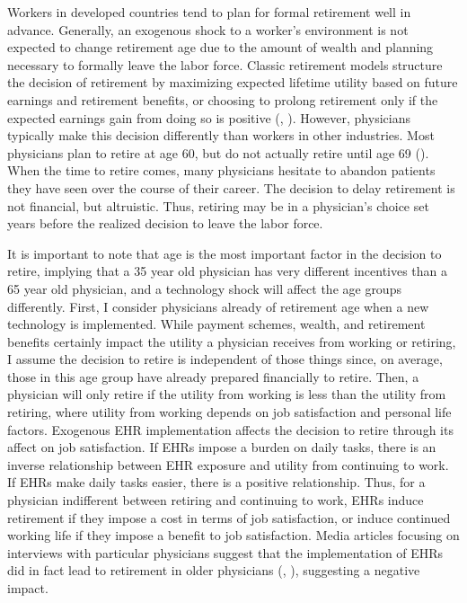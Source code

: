\documentclass[12pt]{article}
\begin{document}
Workers in developed countries tend to plan for formal retirement well in advance. Generally, an exogenous shock to a worker's environment is not expected to change retirement age due to the amount of wealth and planning necessary to formally leave the labor force. Classic retirement models structure the decision of retirement by maximizing expected lifetime utility based on future earnings and retirement benefits, or choosing to prolong retirement only if the expected earnings gain from doing so is positive (\cite{gustman1986disaggregated}, \cite{stock1990pension}). However, physicians typically make this decision differently than workers in other industries. Most physicians plan to retire at age 60, but do not actually retire until age 69 (\cite{collier2017challenges}). When the time to retire comes, many physicians hesitate to abandon patients they have seen over the course of their career. The decision to delay retirement is not financial, but altruistic. Thus, retiring may be in a physician's choice set years before the realized decision to leave the labor force. 

It is important to note that age is the most important factor in the decision to retire, implying that a 35 year old physician has very different incentives than a 65 year old physician, and a technology shock will affect the age groups differently. First, I consider physicians already of retirement age when a new technology is implemented. While payment schemes, wealth, and retirement benefits certainly impact the utility a physician receives from working or retiring, I assume the decision to retire is independent of those things since, on average, those in this age group have already prepared financially to retire. Then, a physician will only retire if the utility from working is less than the utility from retiring, where utility from working depends on job satisfaction and personal life factors. Exogenous EHR implementation affects the decision to retire through its affect on job satisfaction. If EHRs impose a burden on daily tasks, there is an inverse relationship between EHR exposure and utility from continuing to work. If EHRs make daily tasks easier, there is a positive relationship. Thus, for a physician indifferent between retiring and continuing to work, EHRs induce retirement if they impose a cost in terms of job satisfaction, or induce continued working life if they impose a benefit to job satisfaction. Media articles focusing on interviews with particular physicians suggest that the implementation of EHRs did in fact lead to retirement in older physicians (\cite{ringel_2019}, \cite{loria_2020}), suggesting a negative impact. 
\end{document}
